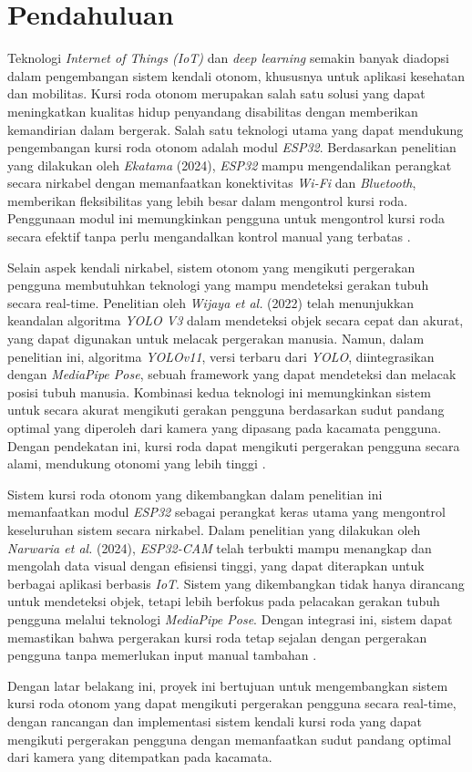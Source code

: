 \section{Pendahuluan}
\label{sec:pendahuluan}

Teknologi \emph{Internet of Things (IoT)} dan \emph{deep learning} semakin banyak diadopsi dalam pengembangan sistem kendali otonom, khususnya untuk aplikasi kesehatan dan mobilitas. Kursi roda otonom merupakan salah satu solusi yang dapat meningkatkan kualitas hidup penyandang disabilitas dengan memberikan kemandirian dalam bergerak. Salah satu teknologi utama yang dapat mendukung pengembangan kursi roda otonom adalah modul \emph{ESP32}. Berdasarkan penelitian yang dilakukan oleh \emph{Ekatama} (2024), \emph{ESP32} mampu mengendalikan perangkat secara nirkabel dengan memanfaatkan konektivitas \emph{Wi-Fi} dan \emph{Bluetooth}, memberikan fleksibilitas yang lebih besar dalam mengontrol kursi roda. Penggunaan modul ini memungkinkan pengguna untuk mengontrol kursi roda secara efektif tanpa perlu mengandalkan kontrol manual yang terbatas \cite{ekatama2024perancangan}.

Selain aspek kendali nirkabel, sistem otonom yang mengikuti pergerakan pengguna membutuhkan teknologi yang mampu mendeteksi gerakan tubuh secara real-time. Penelitian oleh \emph{Wijaya et al.} (2022) telah menunjukkan keandalan algoritma \emph{YOLO V3} dalam mendeteksi objek secara cepat dan akurat, yang dapat digunakan untuk melacak pergerakan manusia. Namun, dalam penelitian ini, algoritma \emph{YOLOv11}, versi terbaru dari \emph{YOLO}, diintegrasikan dengan \emph{MediaPipe Pose}, sebuah framework yang dapat mendeteksi dan melacak posisi tubuh manusia. Kombinasi kedua teknologi ini memungkinkan sistem untuk secara akurat mengikuti gerakan pengguna berdasarkan sudut pandang optimal yang diperoleh dari kamera yang dipasang pada kacamata pengguna. Dengan pendekatan ini, kursi roda dapat mengikuti pergerakan pengguna secara alami, mendukung otonomi yang lebih tinggi \cite{wijaya2022deteksi}.

Sistem kursi roda otonom yang dikembangkan dalam penelitian ini memanfaatkan modul \emph{ESP32} sebagai perangkat keras utama yang mengontrol keseluruhan sistem secara nirkabel. Dalam penelitian yang dilakukan oleh \emph{Narwaria et al.} (2024), \emph{ESP32-CAM} telah terbukti mampu menangkap dan mengolah data visual dengan efisiensi tinggi, yang dapat diterapkan untuk berbagai aplikasi berbasis \emph{IoT}. Sistem yang dikembangkan tidak hanya dirancang untuk mendeteksi objek, tetapi lebih berfokus pada pelacakan gerakan tubuh pengguna melalui teknologi \emph{MediaPipe Pose}. Dengan integrasi ini, sistem dapat memastikan bahwa pergerakan kursi roda tetap sejalan dengan pergerakan pengguna tanpa memerlukan input manual tambahan \cite{10696374}.

Dengan latar belakang ini, proyek ini bertujuan untuk mengembangkan sistem kursi roda otonom yang dapat mengikuti pergerakan pengguna secara real-time, dengan rancangan dan implementasi sistem kendali kursi roda yang dapat mengikuti pergerakan pengguna dengan memanfaatkan sudut pandang optimal dari kamera yang ditempatkan pada kacamata.
